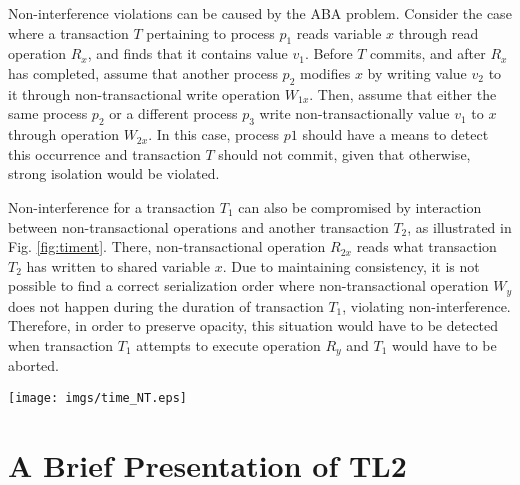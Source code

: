 \documentclass[runningheads,a4paper]{llncs}
\begin{document}
Non-interference violations can be caused  by the ABA problem. Consider the
case where a transaction $T$  
pertaining  to process  $p_1$  reads variable  $x$  through read  operation
$R_x$, and finds that it contains value  
$v_1$.  Before $T$  commits, and  after  $R_x$ has  completed, assume  that
another process $p_2$ modifies $x$  
by  writing value  $v_2$ to  it through  non-transactional  write operation
$W_{1x}$. Then, assume that either the  
same process  $p_2$ or a different process  $p_3$ write non-transactionally
value $v_1$ to $x$ through operation  
$W_{2x}$. In  this case, process  $p1$ should have  a means to  detect this
occurrence and transaction $T$ should  
not commit, given that otherwise, strong isolation would be violated. 


Non-interference for  a transaction  $T_1$ can also  be compromised  by 
interaction between non-transactional  
operations  and  another  transaction   $T_2$,  as  illustrated  in  Fig.
\ref{fig:timent}. There, non-transactional operation  
$R_{2x}$  reads  what transaction  $T_2$  has  written  to shared  variable
$x$. Due to maintaining consistency, it is not  
possible  to find  a  correct serialization  order where  non-transactional
operation $W_y$ does not happen during the  
duration  of transaction $T_1$,  violating non-interference.  Therefore, in
order to preserve opacity, this situation would  
have to  be detected when  transaction $T_1$ attempts to  execute operation
$R_y$ and $T_1$ would have to be aborted. 
 

\begin{figure*}[ht]
\centerline{
    \mbox{\texttt{[image: imgs/time\_NT.eps]}}
}
\caption{Transaction  $T_2$  and  non-transactional operations  of  process
$p_3$ interfere with transaction $T_1$.} 
\label{fig:timent}
\end{figure*}



\section{A Brief Presentation of TL2}
\label{sec:tl2}

\end{document}
